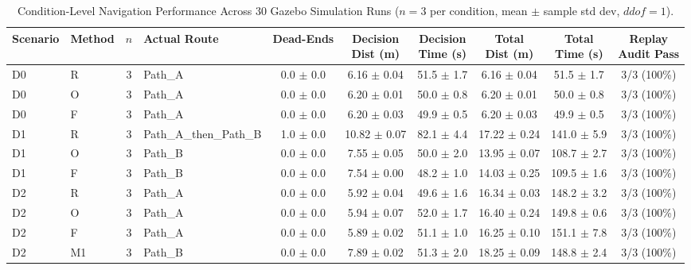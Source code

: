 \begin{table}[t]
\centering
\small
\caption{Condition-Level Navigation Performance Across 30 Gazebo Simulation Runs ($n=3$ per condition, mean $\pm$ sample std dev, $ddof=1$).}
\label{tab:condition_summary}
\setlength{\tabcolsep}{3.8pt}
\begin{tabular*}{\textwidth}{@{\extracolsep{\fill}}llclcccccc@{}}
\toprule
Scenario & Method & $n$ & Actual Route & Dead-Ends & \shortstack{Decision\\Dist (m)} & \shortstack{Decision\\Time (s)} & \shortstack{Total\\Dist (m)} & \shortstack{Total\\Time (s)} & \shortstack{Replay\\Audit Pass} \\
\midrule
D0 & R  & 3 & Path\_A                & 0.0 $\pm$ 0.0 & 6.16 $\pm$ 0.04  & 51.5 $\pm$ 1.7 & 6.16 $\pm$ 0.04  & 51.5 $\pm$ 1.7  & 3/3 (100\%) \\
D0 & O  & 3 & Path\_A                & 0.0 $\pm$ 0.0 & 6.20 $\pm$ 0.01  & 50.0 $\pm$ 0.8 & 6.20 $\pm$ 0.01  & 50.0 $\pm$ 0.8  & 3/3 (100\%) \\
D0 & F  & 3 & Path\_A                & 0.0 $\pm$ 0.0 & 6.20 $\pm$ 0.03  & 49.9 $\pm$ 0.5 & 6.20 $\pm$ 0.03  & 49.9 $\pm$ 0.5  & 3/3 (100\%) \\
D1 & R  & 3 & Path\_A\_then\_Path\_B & 1.0 $\pm$ 0.0 & 10.82 $\pm$ 0.07 & 82.1 $\pm$ 4.4 & 17.22 $\pm$ 0.24 & 141.0 $\pm$ 5.9 & 3/3 (100\%) \\
D1 & O  & 3 & Path\_B                & 0.0 $\pm$ 0.0 & 7.55 $\pm$ 0.05  & 50.0 $\pm$ 2.0 & 13.95 $\pm$ 0.07 & 108.7 $\pm$ 2.7 & 3/3 (100\%) \\
D1 & F  & 3 & Path\_B                & 0.0 $\pm$ 0.0 & 7.54 $\pm$ 0.00  & 48.2 $\pm$ 1.0 & 14.03 $\pm$ 0.25 & 109.5 $\pm$ 1.6 & 3/3 (100\%) \\
D2 & R  & 3 & Path\_A                & 0.0 $\pm$ 0.0 & 5.92 $\pm$ 0.04  & 49.6 $\pm$ 1.6 & 16.34 $\pm$ 0.03 & 148.2 $\pm$ 3.2 & 3/3 (100\%) \\
D2 & O  & 3 & Path\_A                & 0.0 $\pm$ 0.0 & 5.94 $\pm$ 0.07  & 52.0 $\pm$ 1.7 & 16.40 $\pm$ 0.24 & 149.8 $\pm$ 0.6 & 3/3 (100\%) \\
D2 & F  & 3 & Path\_A                & 0.0 $\pm$ 0.0 & 5.89 $\pm$ 0.02  & 51.1 $\pm$ 1.0 & 16.25 $\pm$ 0.10 & 151.1 $\pm$ 7.8 & 3/3 (100\%) \\
D2 & M1 & 3 & Path\_B                & 0.0 $\pm$ 0.0 & 7.89 $\pm$ 0.02  & 51.3 $\pm$ 2.0 & 18.25 $\pm$ 0.09 & 148.8 $\pm$ 2.4 & 3/3 (100\%) \\
\bottomrule
\end{tabular*}
\end{table}
